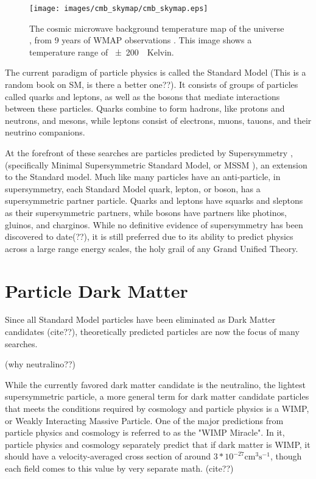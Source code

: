   \begin{figure}[ht]
    \texttt{[image: images/cmb\_skymap/cmb\_skymap.eps]}
    \caption[The Cosmic Microwave Background]{
      The cosmic microwave background temperature map of the universe \cite{wmap_skymap}, from 9 years of WMAP observations \cite{wmap9year}.
      This image shows a temperature range of \SI{\pm200}{\mu{}Kelvin}.
    }
    \label{fig:cmb}
  \end{figure}

  The current paradigm of particle physics is called the Standard Model \cite{standardmodel} {\color{red}(This is a random book on SM, is there a better one??)}.
  It consists of groups of particles called quarks and leptons, as well as the bosons that mediate interactions between these particles.
  Quarks combine to form hadrons, like protons and neutrons, and mesons, while leptons consist of electrons, muons, tauons, and their neutrino companions.

  At the forefront of these searches are particles predicted by Supersymmetry \cite{Jungman:1995df}, (specifically Minimal Supersymmetric Standard Model, or MSSM \cite{MSSM}), an extension to the Standard model.
  Much like many particles have an anti-particle, in supersymmetry, each Standard Model quark, lepton, or boson, has a supersymmetric partner particle.
  Quarks and leptons have squarks and sleptons as their supersymmetric partners, while bosons have partners like photinos, gluinos, and charginos.
  While no definitive evidence of supersymmetry has been discovered to date{\color{red}(??)}, it is still preferred due to its ability to predict physics across a large range energy scales, the holy grail of any Grand Unified Theory.
  

\section{Particle Dark Matter}

  Since all Standard Model particles have been eliminated as Dark Matter candidates {\color{red}(cite??)}, theoretically predicted particles are now the focus of many searches.

  {\color{red}(why neutralino??)}
  
  While the currently favored dark matter candidate is the neutralino, the lightest supersymmetric particle, a more general term for dark matter candidate particles that meets the conditions required by cosmology and particle physics is a WIMP, or Weakly Interacting Massive Particle.
  One of the major predictions from particle physics and cosmology is referred to as the "WIMP Miracle".
  In it, particle physics and cosmology separately predict that if dark matter is WIMP, it should have a velocity-averaged cross section of around $3*10^{-27}\text{cm}^{3}\text{s}^{-1}$, though each field comes to this value by very separate math. {\color{red}(cite??)}

